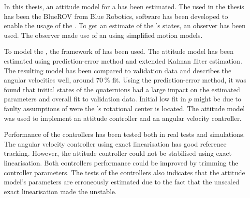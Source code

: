 In this thesis, an attitude model for a \abbrROV has been estimated. The \abbrROV used in the thesis has been the BlueROV from Blue Robotics, software has been developed to enable the usage of the \abbrROV. To get an estimate of the \abbrROV's states, an observer has been used. The observer made use of an \abbrEKF using simplified motion models.

To model the \abbrROV, the framework of \citet{fossen2011} has been used. The attitude model has been estimated using prediction-error method and extended Kalman filter estimation. The resulting model has been compared to validation data and describes the angular velocities well, around $70\ \%$ fit. Using the prediction-error method, it was found that initial states of the quaternions had a large impact on the estimated parameters and overall fit to validation data. Initial low fit in $p$ might be due to faulty assumptions of were the \abbrROV's rotational center is located. The attitude model was used to implement an attitude controller and an angular velocity controller. 

Performance of the controllers has been tested both in real tests and simulations. The angular velocity controller using exact linearisation has good reference tracking. However, the attitude controller could not be stabilised using exact linearisation. Both controllers performance could be improved by trimming the controller parameters. 
The tests of the controllers also indicates that the attitude model's parameters are erroneously estimated due to the fact that the unscaled exact linearisation made the \abbrROV unstable.
